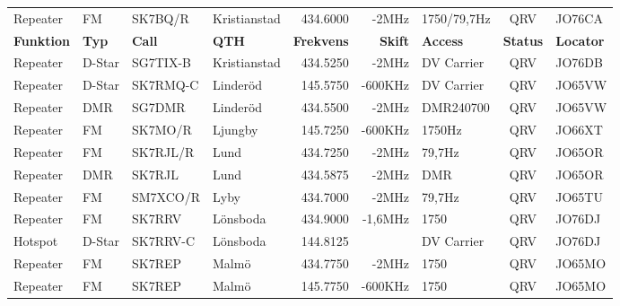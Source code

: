 \begin{landscape}
\begin{longtable}{llllrrlcl}
	Repeater          & FM           & SK7BQ/R       & Kristianstad        &          434.6000 &          -2MHz & 1750/79,7Hz     &       QRV       & JO76CA           \\
		\textbf{Funktion} & \textbf{Typ} & \textbf{Call} & \textbf{QTH}        & \textbf{Frekvens} & \textbf{Skift} & \textbf{Access} & \textbf{Status} & \textbf{Locator} \\ \hline
	Repeater          & D-Star       & SG7TIX-B      & Kristianstad        &          434.5250 &          -2MHz & DV Carrier      &       QRV       & JO76DB           \\
	Repeater          & D-Star       & SK7RMQ-C      & Linderöd            &          145.5750 &        -600KHz & DV Carrier      &       QRV       & JO65VW           \\
	Repeater          & DMR          & SG7DMR        & Linderöd            &          434.5500 &          -2MHz & DMR240700       &       QRV       & JO65VW           \\
	Repeater          & FM           & SK7MO/R       & Ljungby             &          145.7250 &        -600KHz & 1750Hz          &       QRV       & JO66XT           \\
	Repeater          & FM           & SK7RJL/R      & Lund                &          434.7250 &          -2MHz & 79,7Hz          &       QRV       & JO65OR           \\
	Repeater          & DMR          & SK7RJL        & Lund                &          434.5875 &          -2MHz & DMR             &       QRV       & JO65OR           \\
	Repeater          & FM           & SM7XCO/R      & Lyby                &          434.7000 &          -2MHz & 79,7Hz          &       QRV       & JO65TU           \\
	Repeater          & FM           & SK7RRV        & Lönsboda            &          434.9000 &        -1,6MHz & 1750            &       QRV       & JO76DJ           \\
	Hotspot           & D-Star       & SK7RRV-C      & Lönsboda            &          144.8125 &                & DV Carrier      &       QRV       & JO76DJ           \\
	Repeater          & FM           & SK7REP        & Malmö               &          434.7750 &          -2MHz & 1750            &       QRV       & JO65MO           \\
	Repeater          & FM           & SK7REP        & Malmö               &          145.7750 &        -600KHz & 1750            &       QRV       & JO65MO           \\

\end{longtable}
\end{landscape}
